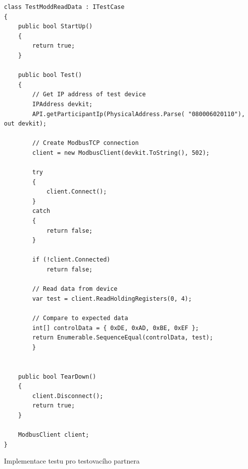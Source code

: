 \begin{listing}[p]
    \centering
    \begin{verbatim}
class TestModdReadData : ITestCase
{
    public bool StartUp()
    {
        return true;
    }

    public bool Test()
    {
        // Get IP address of test device
        IPAddress devkit;
        API.getParticipantIp(PhysicalAddress.Parse( "080006020110"), out devkit);

        // Create ModbusTCP connection
        client = new ModbusClient(devkit.ToString(), 502);

        try 
        {
            client.Connect();
        }
        catch 
        {
            return false;
        }

        if (!client.Connected)
            return false;

        // Read data from device
        var test = client.ReadHoldingRegisters(0, 4);
            
        // Compare to expected data
        int[] controlData = { 0xDE, 0xAD, 0xBE, 0xEF };
        return Enumerable.SequenceEqual(controlData, test);
        }


    public bool TearDown()
    {
        client.Disconnect();
        return true;
    }

    ModbusClient client;
}
    \end{verbatim}
\caption{Implementace testu pro testovacího partnera}
\label{listing:testcase_partner}
\end{listing}

